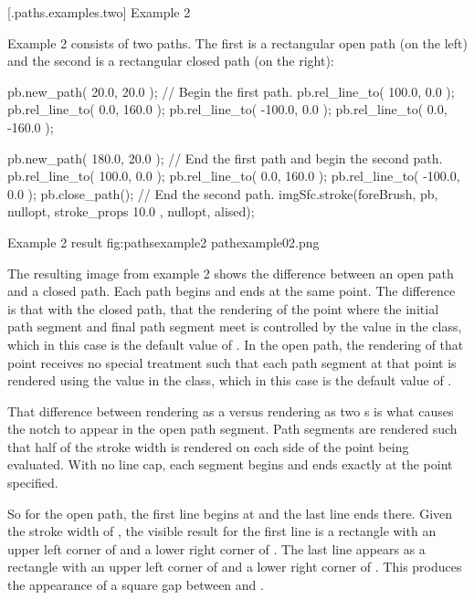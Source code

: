 \FloatBarrier

 [\iotwod.paths.examples.two] {Example 2}

\pnum
Example 2 consists of two paths. The first is a rectangular open path (on the left) and the second is a rectangular closed path (on the right):

\begin{codeblock}
  pb.new_path({ 20.0, 20.0 }); // Begin the first path.
  pb.rel_line_to({ 100.0, 0.0 });
  pb.rel_line_to({ 0.0, 160.0 });
  pb.rel_line_to({ -100.0, 0.0 });
  pb.rel_line_to({ 0.0, -160.0 });
  
  pb.new_path({ 180.0, 20.0 }); // End the first path and begin the second path.
  pb.rel_line_to({ 100.0, 0.0 });
  pb.rel_line_to({ 0.0, 160.0 });
  pb.rel_line_to({ -100.0, 0.0 });
  pb.close_path(); // End the second path.
  imgSfc.stroke(foreBrush, pb, nullopt, stroke_props{ 10.0 }, nullopt, alised);
\end{codeblock}

\begin{importgraphiciotwod}
{Example 2 result}
{fig:pathsexample2}
{pathexample02.png}
\end{importgraphiciotwod}

\FloatBarrier

\pnum
The resulting image from example 2 shows the difference between an open path and a closed path. Each path begins and ends at the same point. The difference is that with the closed path, that the rendering of the point where the initial path segment and final path segment meet is controlled by the  value in the  class, which in this case is the default value of . In the open path, the rendering of that point receives no special treatment such that each path segment at that point is rendered using the  value in the  class, which in this case is the default value of .

\pnum
That difference between rendering as a  versus rendering as two s is what causes the notch to appear in the open path segment. Path segments are rendered such that half of the stroke width is rendered on each side of the point being evaluated. With no line cap, each segment begins and ends exactly at the point specified.

\pnum
So for the open path, the first line begins at  and the last line ends there. Given the stroke width of , the visible result for the first line is a rectangle with an upper left corner of  and a lower right corner of . The last line appears as a rectangle with an upper left corner of  and a lower right corner of . This produces the appearance of a square gap between  and .

